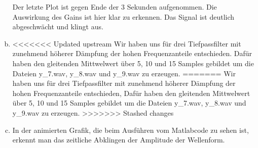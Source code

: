 \begin{enumerate}[a)]
Der letzte Plot ist gegen Ende der 3 Sekunden aufgenommen.
Die Auswirkung des Gains ist hier klar zu erkennen. 
Das Signal ist deutlich abgeschwächt und klingt aus.

\item
<<<<<<< Updated upstream
Wir haben uns für drei Tiefpassfilter mit zunehmend höherer Dämpfung der hohen Frequenzanteile entschieden.
Dafür haben den gleitenden Mittwelwert über 5, 10 und 15 Samples gebildet um die Dateien y\_7.wav, y\_8.wav und y\_9.wav zu erzeugen.
=======
Wir haben uns für drei Tiefpassfilter mit zunehmend höherer Dämpfung der hohen Frequenzanteile entschieden, 
Dafür haben den gleitenden Mittwelwert über 5, 10 und 15 Samples gebildet um die Dateien y_7.wav, y_8.wav und y_9.wav zu erzeugen.
>>>>>>> Stashed changes

\item
In der animierten Grafik, die beim Ausführen vom Matlabcode zu sehen ist, erkennt man das zeitliche Abklingen der Amplitude der Wellenform. 

\end{enumerate}
